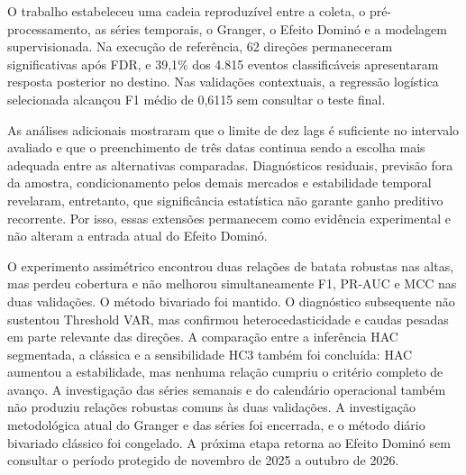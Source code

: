 \documentclass[12pt,a4paper]{article}
\begin{document}
O trabalho estabeleceu uma cadeia reproduzível entre a coleta, o
pré-processamento, as séries temporais, o Granger, o Efeito Dominó e a
modelagem supervisionada. Na execução de referência, 62 direções permaneceram
significativas após FDR, e 39,1\% dos 4.815 eventos classificáveis apresentaram
resposta posterior no destino. Nas validações contextuais, a regressão
logística selecionada alcançou F1 médio de 0,6115 sem consultar o teste final.

As análises adicionais mostraram que o limite de dez lags é suficiente no
intervalo avaliado e que o preenchimento de três datas continua sendo a escolha
mais adequada entre as alternativas comparadas. Diagnósticos residuais,
previsão fora da amostra, condicionamento pelos demais mercados e estabilidade
temporal revelaram, entretanto, que significância estatística não garante ganho
preditivo recorrente. Por isso, essas extensões permanecem como evidência
experimental e não alteram a entrada atual do Efeito Dominó.

O experimento assimétrico encontrou duas relações de batata robustas nas altas,
mas perdeu cobertura e não melhorou simultaneamente F1, PR-AUC e MCC nas duas
validações. O método bivariado foi mantido. O diagnóstico subsequente não
sustentou Threshold VAR, mas confirmou heterocedasticidade e caudas pesadas em
parte relevante das direções. A comparação entre a inferência HAC segmentada, a
clássica e a sensibilidade HC3 também foi concluída: HAC aumentou a estabilidade,
mas nenhuma relação cumpriu o critério completo de avanço. A investigação
das séries semanais e do calendário operacional também não produziu relações
robustas comuns às duas validações. A investigação metodológica atual do
Granger e das séries foi encerrada, e o método diário bivariado clássico foi
congelado. A próxima etapa retorna ao Efeito Dominó sem consultar o período
protegido de novembro de 2025 a outubro de 2026.

\clearpage
\printbibliography[heading=bibintoc,title={Referências}]
\end{document}
